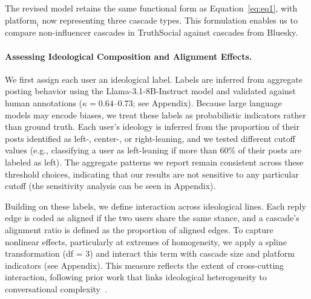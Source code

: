 \documentclass[letterpaper]{article} %
\begin{document}
The revised model retains the same functional form as Equation~\ref{eq:eq1}, with $\text{platform}_i$ now representing three cascade types. This formulation enables us to compare non-influencer cascades in TruthSocial against cascades from Bluesky.

\paragraph*{Assessing Ideological Composition and Alignment Effects.}

We first assign each user an ideological label. Labels are inferred from aggregate posting behavior using the Llama-3.1-8B-Instruct model and validated against human annotations ($\kappa = 0.64$–$0.73$; see Appendix). Because large language models may encode biases, we treat these labels as probabilistic indicators rather than ground truth. Each user’s ideology is inferred from the proportion of their posts identified as left-, center-, or right-leaning, and we tested different cutoff values (e.g., classifying a user as left-leaning if more than 60\% of their posts are labeled as left). The aggregate patterns we report remain consistent across these threshold choices, indicating that our results are not sensitive to any particular cutoff (the sensitivity analysis can be seen in Appendix).

Building on these labels, we define interaction across ideological lines. Each reply edge is coded as aligned if the two users share the same stance, and a cascade’s alignment ratio is defined as the proportion of aligned edges. To capture nonlinear effects, particularly at extremes of homogeneity, we apply a spline transformation (df = 3) and interact this term with cascade size and platform indicators (see Appendix). This measure reflects the extent of cross-cutting interaction, following prior work that links ideological heterogeneity to conversational complexity~\cite{adamic_political_2005, guess_how_2023}.
\end{document}
